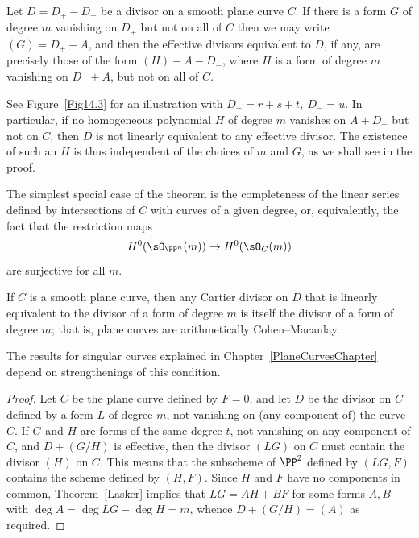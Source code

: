 \begin{theorem}\label{equiv on smooth plane curve}
Let $D= D_{+}-D_{-}$ be a divisor on
a
smooth plane curve $C$. If
there is a form $G$ of degree $m$ vanishing on $D_{+}$ but not on all of $C$
then we may write $(G) = D_{+}+A$, and then
the effective divisors equivalent to $D$, if any, are precisely those
of the form $(H) - A -D_{-}$, where $H$
is a form of degree $m$ vanishing on $D_{-}+A$, but not on all of $C$.
\end{theorem}

See Figure~\ref{Fig14.3} for an illustration with $D_+ = r+s+t, \ D_- = u$.
In particular, if no homogeneous polynomial $H$ of degree $m$ vanishes on  $A + D_{-}$ but not on $C$, then $D$ is not linearly equivalent to any effective divisor. The existence of such an $H$ is thus independent of the choices of $m$ and $G$, as we shall see in the proof.

The simplest special case of the theorem is the completeness
%
of the linear series defined
by intersections of $C$ with curves of a given degree,
or, equivalently, the fact that the restriction maps
$$
H^{0}(\sO_{\PP^{n}}(m)) \to H^{0}(\sO_{C}(m))
$$
are surjective for all $m$.

\begin{proposition}\label {completeness of hyperplanes on plane curve}
If $C$ is a smooth plane curve, then any Cartier divisor on $D$ that is linearly equivalent to the divisor of
a form of degree $m$ is itself the divisor of a form of degree $m$; that is, plane curves are
arithmetically Cohen--Macaulay.
%
\end{proposition}

 The results for singular curves explained in Chapter~\ref{PlaneCurvesChapter}
 depend on strengthenings  of this condition.

\begin{proof}
Let $C$ be the plane curve defined by $F=0$, and let $D$ be the divisor on $C$ defined by a form $L$
of degree $m$, not vanishing on (any component of) the curve $C$. If $G$ and $H$ are forms of the same degree $t$,
not vanishing on any component of $C$,
and $D+(G/H)$ is effective, then the divisor $(LG)$  on $C$ must contain the divisor $(H)$ on $C$.
This means that the subscheme of $\PP^{2}$ defined by $(LG,F)$ contains the scheme defined
by $(H,F)$. Since $H$ and $F$ have no components in common, Theorem~\ref{Lasker} implies
that $LG = AH+BF$  for some forms $A,B$ with $\deg A = \deg LG -\deg H = m$,
 whence $D+(G/H) = (A)$
as required.
\end{proof}

